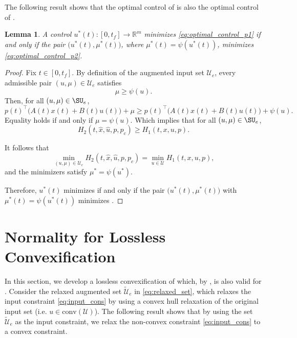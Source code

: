 \documentclass[conf]{new-aiaa}
\newtheorem{lemma}{Lemma}
\begin{document}
The following result shows that the optimal control of  is also the optimal control of .

\begin{lemma}\rm\label{lemma:MICP2mayer}
A control $u^*(t):[0,t_f]\to\mathbb{R}^m$ minimizes \cref{eq:optimal_control_p1} if and only if the pair $\big(u^*(t),\mu^*(t)\big)$, where $\mu^*(t)=\psi(u^*(t))$, minimizes \cref{eq:optimal_control_p2}. 
\end{lemma}

\begin{proof}
    Fix $t\in[0,t_f]$. By definition of the augmented input set $\mathcal{U}_e$, every admissible pair $(u,\mu)\in\mathcal{U}_e$ satisfies
    \begin{equation*}
    \mu \ge \psi(u).
    \end{equation*}
    Then, for all $(u,\mu) \in \SU_e$,
    \begin{equation*}
    p(t)^\top\big(A(t)x(t)+B(t)u(t)\big) + \mu \geq p(t)^\top\big(A(t)x(t)+B(t)u(t)\big) + \psi(u).
    \end{equation*}
    Equality holds if and only if $\mu=\psi(u)$. Which implies that for all $(u,\mu) \in \SU_e$,
    \begin{equation*}
    H_2(t,\hat x,\hat u,p, p_c) \geq H_1(t,x,u,p).
    \end{equation*}
    
    It follows that
    \begin{equation*}
    \min_{(u,\mu)\in\mathcal{U}_e} H_2(t,\hat x,\hat u,p,p_c)
    =
    \min_{u\in\mathcal{U}} H_1(t,x,u,p),
    \end{equation*}
    and the minimizers satisfy $\mu^*=\psi(u^*)$.
    
    Therefore, $u^*(t)$ minimizes  if and only if the pair $\big(u^*(t),\mu^*(t)\big)$ with $\mu^*(t)=\psi(u^*(t))$ minimizes .
\end{proof}

\section{Normality for Lossless Convexification}\label{sec:LosslessConv}

In this section, we develop a lossless convexification of  which, by , is also valid for . Consider the relaxed augmented set $\tilde{\mathcal{U}}_e$ in \cref{eq:relaxed_set}, which relaxes the input constraint \cref{eq:input_cons} by using a convex hull relaxation of the original input set (i.e. $u \in \mathrm{conv}(\mathcal{U})$). The following result shows that by using the set $\tilde{\mathcal{U}}_e$ as the input constraint, we relax the non-convex constraint \cref{eq:input_cons} to a convex constraint.
\end{document}
